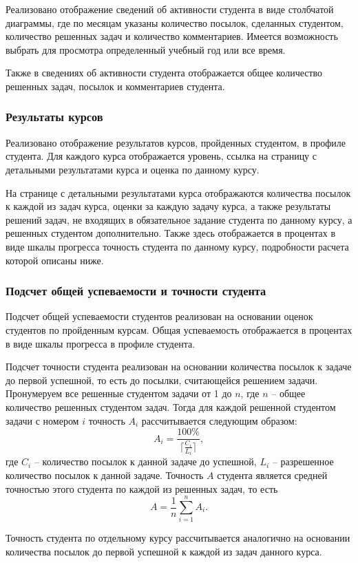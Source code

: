 \documentclass[12pt, a4paper, oneside]{article}
\begin{document}
Реализовано отображение сведений об активности студента в виде столбчатой диаграммы, где по месяцам указаны количество посылок, сделанных студентом, количество решенных задач и количество комментариев. Имеется возможность выбрать для просмотра определенный учебный год или все время.

Также в сведениях об активности студента отображается общее количество решенных задач, посылок и комментариев студента.
\subsubsection{Результаты курсов}
Реализовано отображение результатов курсов, пройденных студентом, в профиле студента. Для каждого курса отображается уровень, ссылка на страницу с детальными результатами курса и оценка по данному курсу.

На странице с детальными результатами курса отображаются количества посылок к каждой из задач курса, оценки за каждую задачу курса, а также результаты решений задач, не входящих в обязательное задание студента по данному курсу, а решенных студентом дополнительно. Также здесь отображается в процентах в виде шкалы прогресса точность студента по данному курсу, подробности расчета которой описаны ниже.
\subsubsection{Подсчет общей успеваемости и точности студента}
Подсчет общей успеваемости студентов реализован на основании оценок студентов по пройденным курсам. Общая успеваемость отображается в процентах в виде шкалы прогресса в профиле студента.

Подсчет точности студента реализован на основании количества посылок к задаче до первой успешной, то есть до посылки, считающейся решением задачи. Пронумеруем все решенные студентом задачи от 1 до $n$, где $n$ – общее количество решенных студентом задач. Тогда для каждой решенной студентом задачи с номером $i$ точность $A_i$ рассчитывается следующим образом: 
$$A_i=\frac{100\%}{\lceil \frac{C_i}{L_i}\rceil},$$
где $C_i$ – количество посылок к данной задаче до успешной, $L_i$ – разрешенное количество посылок к данной задаче. Точность $A$ студента является средней точностью этого студента по каждой из решенных задач, то есть
$$A=\frac{1}{n}\sum_{i=1}^{n}A_i.$$

Точность студента по отдельному курсу рассчитывается аналогично на основании количества посылок до первой успешной к каждой из задач данного курса.
\end{document}
